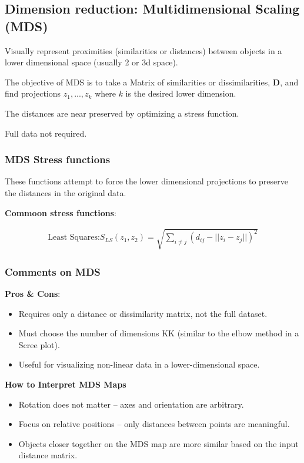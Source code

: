 \subsection{Dimension reduction: Multidimensional Scaling (MDS)}

\indent 

Visually represent proximities (similarities or distances) between objects in a lower dimensional space (usually 2 or 3d space).

The objective of MDS is to take a Matrix of similarities or dissimilarities, $\boldsymbol{D}$, and find projections $z_1,...,z_k$ where $k$ is the desired lower dimension.

The distances are near preserved by optimizing a stress function.

Full data not required.

\subsubsection{MDS Stress functions}

\indent 

These functions attempt to force the lower dimensional projections to preserve the distances in the original data.

\noindent\textbf{Commoon stress functions}:

\begin{align*}
    \text{Least Squares:}S_{LS}(z_1,z_2) = \sqrt{\sum_{i\neq j}(d_{ij} - ||z_i-z_j||)^2}
\end{align*}

\subsubsection{Comments on MDS}

\indent 

\noindent\textbf{Pros \& Cons}:

\begin{itemize}
    \item Requires only a distance or dissimilarity matrix, not the full dataset.
    \item Must choose the number of dimensions KK (similar to the elbow method in a Scree plot).
    \item Useful for visualizing non-linear data in a lower-dimensional space.
\end{itemize}

\bigskip 

\noindent\textbf{How to Interpret MDS Maps}

\begin{itemize}
    \item Rotation does not matter – axes and orientation are arbitrary.
    \item Focus on relative positions – only distances between points are meaningful.
    \item Objects closer together on the MDS map are more similar based on the input distance matrix.
\end{itemize}